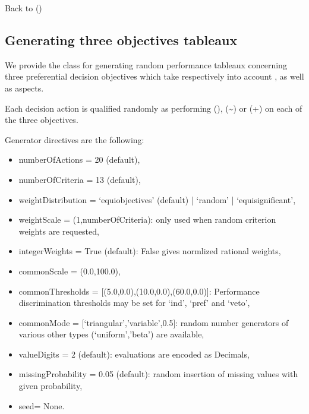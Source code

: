 \documentclass[a4paper,10pt,english]{sphinxhowto}
\begin{document}
Back to {\hyperref[\detokenize{tutorial:tutorial-label}]{}} ()


\subsection{Generating three objectives tableaux}
\label{\detokenize{tutorial:generating-three-objectives-tableaux}}
We provide the  class for generating random performance tableaux concerning three preferential decision objectives which take respectively into account ,  as well as  aspects.

Each decision action is qualified randomly as performing  (\sphinxhyphen{}),  (\textasciitilde{}) or  (+) on each of the three objectives.

Generator directives are the following:
\begin{itemize}
\item {} 
numberOfActions = 20 (default),

\item {} 
numberOfCriteria = 13 (default),

\item {} 
weightDistribution = ‘equiobjectives’ (default) | ‘random’ | ‘equisignificant’,

\item {} 
weightScale = (1,numberOfCriteria): only used when random criterion weights are requested,

\item {} 
integerWeights = True (default): False gives normlized rational weights,

\item {} 
commonScale = (0.0,100.0),

\item {} 
commonThresholds = {[}(5.0,0.0),(10.0,0.0),(60.0,0.0){]}: Performance discrimination thresholds may be set for ‘ind’, ‘pref’ and ‘veto’,

\item {} 
commonMode = {[}‘triangular’,’variable’,0.5{]}: random number generators of various other types (‘uniform’,’beta’) are available,

\item {} 
valueDigits = 2 (default): evaluations are encoded as Decimals,

\item {} 
missingProbability = 0.05 (default): random insertion of missing values with given probability,

\item {} 
seed= None.

\end{itemize}
\end{document}
